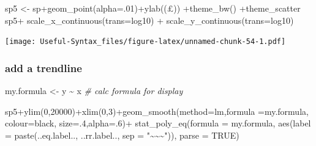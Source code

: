 \documentclass[
]{article}
\newenvironment{Shaded}{\begin{snugshade}}{\end{snugshade}}
\newcommand{\AttributeTok}[1]{\textcolor[rgb]{0.77,0.63,0.00}{#1}}
\newcommand{\CommentTok}[1]{\textcolor[rgb]{0.56,0.35,0.01}{\textit{#1}}}
\newcommand{\ConstantTok}[1]{\textcolor[rgb]{0.00,0.00,0.00}{#1}}
\newcommand{\DecValTok}[1]{\textcolor[rgb]{0.00,0.00,0.81}{#1}}
\newcommand{\FunctionTok}[1]{\textcolor[rgb]{0.00,0.00,0.00}{#1}}
\newcommand{\NormalTok}[1]{#1}
\newcommand{\OtherTok}[1]{\textcolor[rgb]{0.56,0.35,0.01}{#1}}
\newcommand{\SpecialCharTok}[1]{\textcolor[rgb]{0.00,0.00,0.00}{#1}}
\newcommand{\StringTok}[1]{\textcolor[rgb]{0.31,0.60,0.02}{#1}}
\begin{document}
\begin{Shaded}
\begin{Highlighting}[]
\NormalTok{sp5 }\OtherTok{\textless{}{-}}\NormalTok{ sp}\SpecialCharTok{+}\FunctionTok{geom\_point}\NormalTok{(}\AttributeTok{alpha=}\NormalTok{.}\DecValTok{01}\NormalTok{)}\SpecialCharTok{+}\FunctionTok{ylab}\NormalTok{(}\StringTok{\textquotesingle{}(£)\textquotesingle{}}\NormalTok{) }\SpecialCharTok{+}\FunctionTok{theme\_bw}\NormalTok{() }\SpecialCharTok{+}\NormalTok{theme\_scatter}
\NormalTok{sp5}\SpecialCharTok{+} \FunctionTok{scale\_x\_continuous}\NormalTok{(}\AttributeTok{trans=}\StringTok{\textquotesingle{}log10\textquotesingle{}}\NormalTok{) }\SpecialCharTok{+}
  \FunctionTok{scale\_y\_continuous}\NormalTok{(}\AttributeTok{trans=}\StringTok{\textquotesingle{}log10\textquotesingle{}}\NormalTok{)}
\end{Highlighting}
\end{Shaded}

\texttt{[image: Useful-Syntax\_files/figure-latex/unnamed-chunk-54-1.pdf]}

\hypertarget{add-a-trendline}{%
\subsubsection{add a trendline}\label{add-a-trendline}}

\begin{Shaded}
\begin{Highlighting}[]
\NormalTok{my.formula }\OtherTok{\textless{}{-}}\NormalTok{ y }\SpecialCharTok{\textasciitilde{}}\NormalTok{ x }\CommentTok{\# calc formula for display}

\NormalTok{sp5}\SpecialCharTok{+}\FunctionTok{ylim}\NormalTok{(}\DecValTok{0}\NormalTok{,}\DecValTok{20000}\NormalTok{)}\SpecialCharTok{+}\FunctionTok{xlim}\NormalTok{(}\DecValTok{0}\NormalTok{,}\DecValTok{3}\NormalTok{)}\SpecialCharTok{+}\FunctionTok{geom\_smooth}\NormalTok{(}\AttributeTok{method=}\StringTok{\textquotesingle{}lm\textquotesingle{}}\NormalTok{,}\AttributeTok{formula =}\NormalTok{my.formula,}
                                        \AttributeTok{colour=}\StringTok{\textquotesingle{}black\textquotesingle{}}\NormalTok{, }\AttributeTok{size=}\NormalTok{.}\DecValTok{4}\NormalTok{,}\AttributeTok{alpha=}\NormalTok{.}\DecValTok{6}\NormalTok{)}\SpecialCharTok{+}
  \FunctionTok{stat\_poly\_eq}\NormalTok{(}\AttributeTok{formula =}\NormalTok{ my.formula,}
               \FunctionTok{aes}\NormalTok{(}\AttributeTok{label =} \FunctionTok{paste}\NormalTok{(..eq.label.., ..rr.label..,}
                                                        \AttributeTok{sep =} \StringTok{"\textasciitilde{}\textasciitilde{}\textasciitilde{}"}\NormalTok{)), }\AttributeTok{parse =} \ConstantTok{TRUE}\NormalTok{)}
\end{Highlighting}
\end{Shaded}
\end{document}
